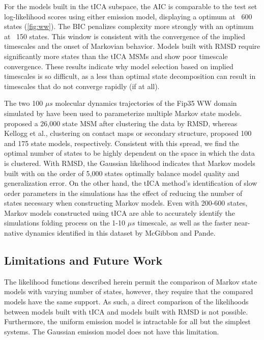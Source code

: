 \documentclass[journal=jpcbfk, layout=twocolumn, manuscript=article]{achemso}
\begin{document}
For the models built in the tICA subspace, the AIC is comparable to the test set log-likelihood scores using either emission model, displaying a optimum at ~600 states (\cref{fig:ww}). The BIC penalizes complexity more strongly with an optimum at ~150 states. This window is consistent with the convergence of the implied timescales and the onset of Markovian behavior. Models built with RMSD require significantly more states than the tICA MSMs and show poor timescale convergence. These results indicate why model selection based on implied timescales is so difficult, as a less than optimal state decomposition can result in timescales that do not converge rapidly (if at all).

The two 100 $\mu s$ molecular dynamics trajectories of the Fip35 WW domain simulated by \citet{Shaw2010Atomic} have been used to parameterize multiple Markov state models. \citet{Lane2011Markov} proposed a 26,000 state MSM after clustering the data by RMSD, whereas Kellogg et al.,\cite{Kellogg2012Evaluation} clustering on contact maps or secondary structure, proposed 100 and 175 state models, respectively. Consistent with this spread, we find the optimal number of states to be highly dependent on the space in which the data is clustered. With RMSD, the Gaussian likelihood indicates that Markov models built with on the order of 5,000 states optimally balance model quality and generalization error. On the other hand, the tICA method's identification of slow order parameters in the simulations has the effect of reducing the number of states necessary when constructing Markov models. Even with 200-600 states, Markov models constructed using tICA are able to accurately identify the simulations folding process on the 1-10 $\mu s$ timescale, as well as the faster near-native dynamics identified in this dataset by McGibbon and Pande\cite{McGibbon2013Learning}.

\subsection{Limitations and Future Work}

The likelihood functions described herein permit the comparison of Markov state models with varying number of states, however, they require that the compared models have the same support. As such, a direct comparison of the likelihoods between models built with tICA and models built with RMSD is not possible. Furthermore, the uniform emission model is intractable for all but the simplest systems. The Gaussian emission model does not have this limitation.
\end{document}
